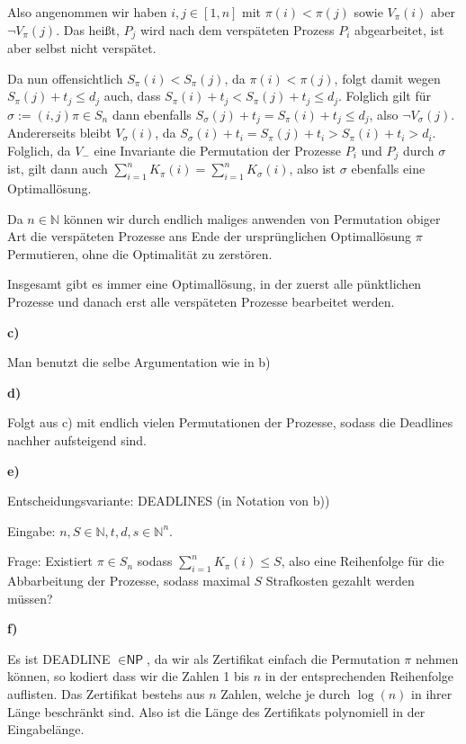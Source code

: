 \documentclass[a4paper,graphics,11pt]{article}
\begin{document}
Also angenommen wir haben $i,j \in [1,n]$ mit $\pi(i) < \pi(j)$ sowie $V_\pi(i)$ aber $\lnot V_\pi(j)$. Das heißt,
$P_j$ wird nach dem verspäteten Prozess $P_i$ abgearbeitet, ist aber selbst nicht verspätet.

Da nun offensichtlich $S_\pi(i) < S_\pi(j)$, da $\pi(i) < \pi(j)$, folgt damit wegen $S_\pi(j) + t_j \leq d_j$
auch, dass $S_\pi(i) + t_j < S_\pi(j) +t_j \leq d_j$. Folglich gilt für $\sigma := (i,j)\pi \in S_n$ dann
ebenfalls $S_\sigma(j) + t_j = S_\pi(i) + t_j \leq d_j$, also $\lnot V_\sigma(j)$. Andererseits bleibt $V_\sigma(i)$,
da $S_\sigma(i) + t_i = S_\pi(j) + t_i > S_\pi(i) + t_i > d_i$.
Folglich, da $V_-$ eine Invariante die Permutation der Prozesse $P_i$ und $P_j$ durch $\sigma$ ist,
gilt dann auch $\sum_{i=1}^{n} K_\pi(i) = \sum_{i=1}^{n} K_\sigma(i)$, also ist $\sigma$ ebenfalls eine Optimallösung.

Da $n \in \mathbb{N}$ können wir durch endlich maliges anwenden von Permutation obiger Art die verspäteten Prozesse
ans Ende der ursprünglichen Optimallösung $\pi$ Permutieren, ohne die Optimalität zu zerstören.

Insgesamt gibt es immer eine Optimallösung, in der zuerst alle pünktlichen Prozesse und danach erst alle verspäteten Prozesse
bearbeitet werden.

\newpage

\textbf{c)}

Man benutzt die selbe Argumentation wie in b)

\textbf{d)}

Folgt aus c) mit endlich vielen Permutationen der Prozesse, sodass die Deadlines nachher aufsteigend sind.

\textbf{e)}

Entscheidungsvariante: DEADLINES (in Notation von b))

Eingabe: $n,S \in \mathbb{N}, t,d,s \in \mathbb{N}^n$.

Frage: Existiert $\pi \in S_n$ sodass $\sum_{i=1}^{n} K_\pi(i) \leq S$, also eine Reihenfolge für die Abbarbeitung der
Prozesse, sodass maximal $S$ Strafkosten gezahlt werden müssen?

\textbf{f)}

Es ist DEADLINE $\in \textsf{NP}$, da wir als Zertifikat einfach die Permutation $\pi$ nehmen können, so kodiert
dass wir die Zahlen 1 bis $n$ in der entsprechenden Reihenfolge auflisten. Das Zertifikat bestehs aus $n$ Zahlen,
welche je durch $\log(n)$ in ihrer Länge beschränkt sind. Also ist die Länge des Zertifikats polynomiell in der Eingabelänge.
\end{document}
